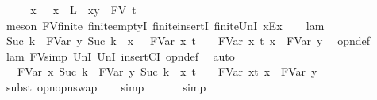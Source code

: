 \begin{isabellebody}
\ \ \isamarkupfalse%
\ \isamarkupfalse%
\ x{\isacharprime}\ \ {}{\isacharcolon}\ {\isachardoublequoteopen}x{\isacharprime}\ {\isasymnotin}\ L\ {\isasymunion}\ {\isacharbraceleft}x{\isacharcomma}y{\isacharbraceright}\ {\isasymunion}\ FV\ t{\isachardoublequoteclose}\ \isamarkupfalse%
\ {\isacharparenleft}meson\ FV{\isacharunderscore}finite\ finite{\isachardot}emptyI\ finite{\isachardot}insertI\ finite{\isacharunderscore}UnI\ x{\isacharunderscore}Ex{\isacharparenright}\isanewline
\ \ \isamarkupfalse%
\ lam\ \isamarkupfalse%
\ {\isachardoublequoteopen}{\isacharbraceleft}Suc\ k\ {\isasymrightarrow}\ FVar\ y{\isacharbraceright}\ {\isacharbraceleft}Suc\ k\ {\isacharless}{\isacharminus}\ x{\isacharbraceright}\ {\isacharbraceleft}{}\ {\isasymrightarrow}\ FVar\ x{\isacharprime}{\isacharbraceright}\ t\ {\isacharequal}\ {\isacharparenleft}{\isacharbraceleft}{}\ {\isasymrightarrow}\ FVar\ x{\isacharprime}{\isacharbraceright}\ t{\isacharparenright}\ {\isacharbrackleft}x\ {\isacharcolon}{\isacharcolon}{\isacharequal}\ FVar\ y{\isacharbrackright}{\isachardoublequoteclose}\ \isamarkupfalse%
\ opn{\isacharprime}{\isacharunderscore}def\ \isamarkupfalse%
\ {\isachardoublequoteopen}lam{\isachardoublequoteclose}{\isacharparenleft}{}{\isacharparenright}\ FV{\isacharunderscore}simp\ UnI{}\ UnI{}\ insertCI\ opn{\isacharprime}{\isacharunderscore}def\ \isamarkupfalse%
\ auto\isanewline
\ \ \isamarkupfalse%
\ \isamarkupfalse%
\ {\isachardoublequoteopen}{\isacharbraceleft}{}\ {\isasymrightarrow}\ FVar\ x{\isacharprime}{\isacharbraceright}\ {\isacharbraceleft}Suc\ k\ {\isasymrightarrow}\ FVar\ y{\isacharbraceright}\ {\isacharbraceleft}Suc\ k\ {\isacharless}{\isacharminus}\ x{\isacharbraceright}\ t\ {\isacharequal}\ {\isacharbraceleft}{}\ {\isasymrightarrow}\ FVar\ x{\isacharprime}{\isacharbraceright}{\isacharparenleft}t\ {\isacharbrackleft}x\ {\isacharcolon}{\isacharcolon}{\isacharequal}\ FVar\ y{\isacharbrackright}{\isacharparenright}{\isachardoublequoteclose}\isanewline
\ \ \isamarkupfalse%
\ {\isacharparenleft}subst\ opn{\isacharunderscore}opn{\isacharunderscore}swap{\isacharparenright}\isanewline
\ \ \isamarkupfalse%
\ simp\isanewline
\ \ \isamarkupfalse%
\ {}\ \isamarkupfalse%
\ simp\isanewline
\ \ \isamarkupfalse%

\end{isabellebody}
